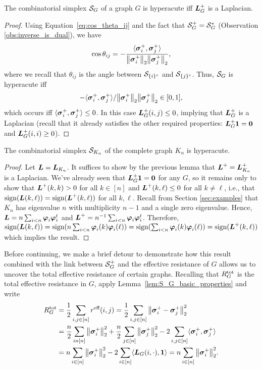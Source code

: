 \begin{lemma}
	The combinatorial simplex $\mathcal{S}_G$ of a graph $G$ is hyperacute iff $\vb*{L}_G^+$ is a Laplacian.
\end{lemma}
\begin{proof}
	Using Equation~\eqref{eq:cos_theta_ij} and the fact that $\mathcal{S}_G^+=\mathcal{S}_G^*$ (Observation \ref{obs:inverse_is_dual}), we have
	\[\cos \theta_{ij} = -\frac{\langle \vb*{\sigma}_i^+,\vb*{\sigma}_j^+\rangle }{\norm{\vb*{\sigma}_i^+}_2 \norm{\vb*{\sigma}_j^+}_2},\]
	where we recall that $\theta_{ij}$ is the angle between $\mathcal{S}_{\{i\}^c}$ and $\mathcal{S}_{\{j\}^c}$. Thus, $\mathcal{S}_G$ is hyperacute iff
	 \[-\langle \vb*{\sigma}_i^+,\vb*{\sigma}_j^+\rangle\\/\norm{\vb*{\sigma}_i^+}_2 \norm{\vb*{\sigma}_j^+}_2 \in[0,1],\] which occurs iff $\langle \vb*{\sigma}_i^+,\vb*{\sigma}_j^+\rangle \leq 0$. In this case $\vb*{L}_G^+(i,j)\leq 0$, implying that $\vb*{L}_G^+$ is a Laplacian (recall that it already satisfies the other required properties: $\vb*{L}_G^+\vb{1}=\vb{0}$ and $\vb*{L}_G^+(i,i)\geq 0$). 
\end{proof}

\begin{corollary}
	\label{cor:Lkn+_laplacian}
	The combinatorial simplex $\mathcal{S}_{K_n}$ of the complete graph $K_n$ is hyperacute. 
\end{corollary}
\begin{proof}
	Let $\vb*{L}=\vb*{L}_{K_n}$. 
	It suffices to show by the previous lemma that $\vb*{L}^+=\vb*{L}_{K_n}^+$ is a Laplacian. We've already seen that $\vb*{L}_G^+\vb{1}=\vb{0}$ for any $G$, so it remains only to show that $\vb*{L}^+(k,k)>0$ for all $k\in[n]$ and $\vb*{L}^+(k,\ell)\leq 0$ for all $k\neq\ell$, i.e., that $\textnormal{sign}(\vb*{L}(k,\ell))=\textnormal{sign}(\vb*{L}^+(k,\ell))$ for all $k,\ell$. Recall from Section \ref{sec:examples} that $K_n$ has eigenvalue $n$ with multiplicity $n-1$ and a single zero eigenvalue. Hence, $\vb*{L}=n\sum_{i<n}\vb*{\varphi}_i\vb*{\varphi}_i^t$ and $\vb*{L}^+=n^{-1}\sum_{i<n}\vb*{\varphi}_i\vb*{\varphi}_i^t$. 
	Therefore, $\textnormal{sign}(\vb*{L}(k,\ell)) = \textnormal{sign}(n\sum_{i<n}\vb*{\varphi}_i(k)\vb*{\varphi}_i(\ell)) = \textnormal{sign}(\sum_{i<n}\vb*{\varphi}_i(k)\vb*{\varphi}_i(\ell)) = \textnormal{sign}(\vb*{L}^+(k,\ell))$ which implies the result. 
\end{proof}

Before continuing, we make a brief  detour  to demonstrate how this result combined  with  the link between $\mathcal{S}_G^+$ and the effective resistance of $G$ allows us to uncover the  total  effective  resistance of certain graphs. Recalling that  $R^{\textnormal{tot}}_G$  is the  total  effective resistance  in  $G$,  apply Lemma~\ref{lem:S_G_basic_properties} and write  
\begin{align*}
R^{\textnormal{tot}}_G &= \frac{1}{2}\sum_{i,j\in[n]} r^{\textnormal{eff}}(i,j) = \frac{1}{2}\sum_{i,j\in[n]}\norm{\vb*{\sigma}_i^+-\vb*{\sigma}_j^+}_2^2 \\ 
&= \frac{n}{2}\sum_{in[n]}\norm{\vb*{\sigma}_i^+}_2^2 + \frac{n}{2}\sum_{j\in[n]}\norm{\vb*{\sigma}_j^+}_2^2 - 2\sum_{i,j\in[n]}\langle\vb*{\sigma}_i^+,\vb*{\sigma}_j^+\rangle \\ 
&= n\sum_{i\in[n]}\norm{\vb*{\sigma}_i^+}_2^2 - 2\sum_{i\in[n]}\langle \vb*{L}_G(i,\cdot),\vb{1}\rangle = n\sum_{i\in[n]}\norm{\vb*{\sigma}_i^+}_2^2.
\end{align*}

